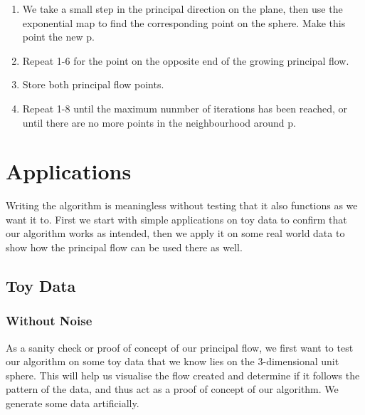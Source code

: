 \documentclass[12pt]{report}
\begin{document}
\begin{enumerate}
    \item We take a small step in the principal direction on the plane,
    then use the exponential map to find the corresponding point on the sphere.
    Make this point the new p.

    \item Repeat 1-6 for the point on the opposite end of the growing principal flow.

    \item Store both principal flow points. 
    
    \item Repeat 1-8 until the maximum nunmber of iterations has been reached,
    or until there are no more points in the neighbourhood around p.
\end{enumerate}


\chapter{Applications}
Writing the algorithm is meaningless without testing that it also functions 
as we want it to. First we start with simple applications on toy data to confirm that 
our algorithm works as intended, then we apply it on some real world data to show
how the principal flow can be used there as well.

\section{Toy Data}

\subsection{Without Noise}

As a sanity check or proof of concept of our principal flow, 
we first want to test our algorithm on some toy data that we know 
lies on the 3-dimensional unit sphere. This will help us visualise the flow created
and determine if it follows the pattern of the data, 
and thus act as a proof of concept of
our algorithm. We generate some data artificially.
\end{document}
